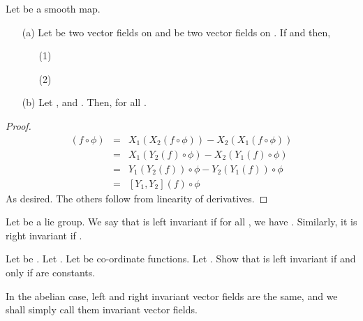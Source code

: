 \documentclass{article}
\begin{document}
\begin{proposition}
    Let  be a smooth map.  
    \begin{enumerate}
        \item[(a)] Let  be two vector fields on  and  be two vector fields on . If  and  then,
        \begin{enumerate} 
            \item[(1)]
            \item[(2)]
        \end{enumerate}
        \item[(b)] Let ,  and . Then,  for all .
    \end{enumerate}
\end{proposition}
\begin{proof}
    \begin{eqnarray*}
        [X_1,X_2](f\circ \phi) &=& X_1(X_2(f\circ \phi)) - X_2(X_1(f\circ \phi))\\
        &=& X_1(Y_2(f)\circ \phi) - X_2(Y_1(f)\circ \phi)\\
        &=& Y_1(Y_2(f))\circ \phi - Y_2(Y_1(f))\circ \phi\\
        &=& [Y_1,Y_2](f)\circ \phi 
    \end{eqnarray*}
    As desired. The others follow from linearity of derivatives.
\end{proof}

\begin{definition}
    Let  be a lie group. We say that  is left invariant if for all , we have .
    Similarly, it is right invariant if .
\end{definition}

\begin{exercise*}
    Let  be . Let . Let  be co-ordinate functions.
    Let . Show that  is left invariant if and only if  are constants.
\end{exercise*}

\begin{remark*}
    In the abelian case, left and right invariant vector fields are the same, and we shall simply call them invariant vector fields.
\end{remark*}
\end{document}
